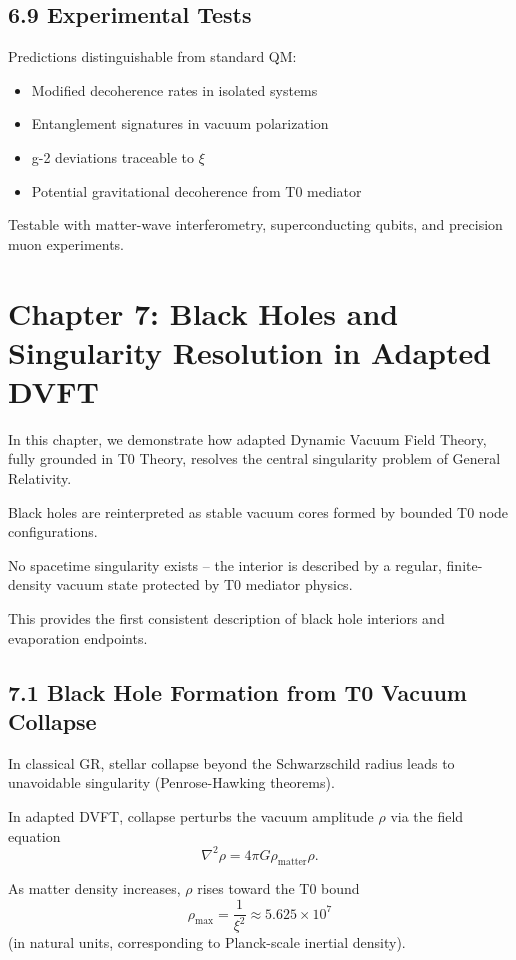 \documentclass[12pt,a4paper]{article}
\begin{document}
	\subsection{6.9 Experimental Tests}
	
	Predictions distinguishable from standard QM:
	\begin{itemize}
		\item Modified decoherence rates in isolated systems
		\item Entanglement signatures in vacuum polarization
		\item g-2 deviations traceable to $\xi$
		\item Potential gravitational decoherence from T0 mediator
	\end{itemize}
	
	Testable with matter-wave interferometry, superconducting qubits, and precision muon experiments.
	
	\section{Chapter 7: Black Holes and Singularity Resolution in Adapted DVFT}
	
	In this chapter, we demonstrate how adapted Dynamic Vacuum Field Theory, fully grounded in T0 Theory, resolves the central singularity problem of General Relativity.
	
	Black holes are reinterpreted as stable vacuum cores formed by bounded T0 node configurations.
	
	No spacetime singularity exists – the interior is described by a regular, finite-density vacuum state protected by T0 mediator physics.
	
	This provides the first consistent description of black hole interiors and evaporation endpoints.
	
	\subsection{7.1 Black Hole Formation from T0 Vacuum Collapse}
	
	In classical GR, stellar collapse beyond the Schwarzschild radius leads to unavoidable singularity (Penrose-Hawking theorems).
	
	In adapted DVFT, collapse perturbs the vacuum amplitude $\rho$ via the field equation
	\[
	\nabla^2 \rho = 4\pi G \rho_{\text{matter}} \rho.
	\]
	
	As matter density increases, $\rho$ rises toward the T0 bound
	\[
	\rho_{\text{max}} = \frac{1}{\xi^2} \approx 5.625 \times 10^7
	\]
	(in natural units, corresponding to Planck-scale inertial density).
	
\end{document}
